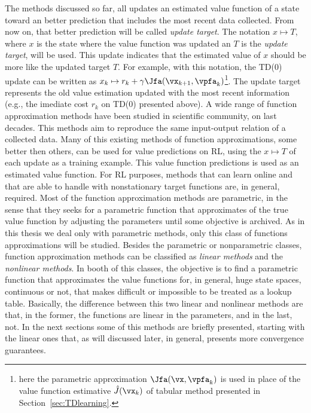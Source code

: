The methods discussed so far, all updates an estimated value function of a state toward an better prediction that includes the most recent data collected.
From now on, that better prediction will be called \textit{update target}.
The notation $x \mapsto T$, where $x$ is the state where the value function was updated an $T$ is the \textit{update target}, will be used.
This update indicates that the estimated value of $x$ should be more like the updated target  $T$.
For example, with this notation, the TD(0) update can be written as $x_k \mapsto r_k + \gamma \Jfa(\vx_{k+1},\vpfa_k)$\footnote
{
  here the parametric approximation $\Jfa(\vx,\vpfa_k)$ is used in place of the value function estimative $\hat{J} (\vx_k)$ of tabular method presented in Section~\ref{sec:TDlearning}.
}.
The update target represents the old value estimation updated with the most recent information (e.g., the imediate cost $r_k$ on TD(0) presented above).
A wide range of function approximation methods have been studied in scientific community, on last decades. This methods aim to reproduce the same input-output relation of a collected data.
Many of this existing methods of function approximations, some better then others, can be used for value  predictions on RL, using the $x \mapsto T$ of each update as a training example.
This value function predictions is used as an estimated value function.
For RL purposes, methods that can learn online and that are able to handle with nonstationary target functions are, in general, required.
Most of the function approximation methods are parametric, in the sense that they seeks for a parametric function that approximates of the true value function by adjusting the parameters until some objective is archived.
As in this thesis we deal only with parametric methods, only this class of functions approximations will be studied.
Besides the parametric or nonparametric classes, function approximation methods can be classified as \textit{linear methods} and the \textit{nonlinear methods}.
In booth of this classes, the objective is to find a parametric function that approximates the value functions for, in general, huge state spaces, continuous or not, that makes difficult or impossible to be treated as a lookup table.
Basically, the difference between this two linear and nonlinear methods are that, in the former, the functions are linear in the parameters, and in the last, not.
In the next sections some of this methods are briefly presented, starting with the linear ones that, as will discussed later, in general, presents more convergence guarantees.

